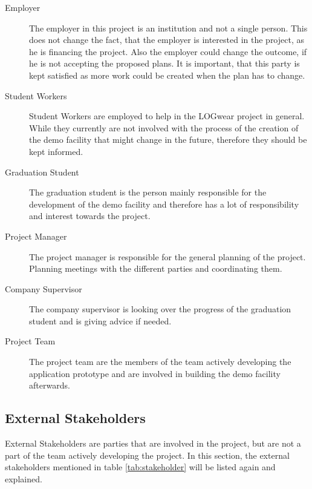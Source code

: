 \begin{description}
	\item[Employer] \hfill
	
	The employer in this project is an institution and not a single person. This does not change the fact, that the employer is interested in the project, as he is financing the project. Also the employer could change the outcome, if he is not accepting the proposed plans. It is important, that this party is kept satisfied as more work could be created when the plan has to change.
	\item[Student Workers] \hfill
	
	Student Workers are employed to help in the LOGwear project in general. While they currently are not involved with the process of the creation of the demo facility that might change in the future, therefore they should be kept informed.
	\item[Graduation Student] \hfill
	
	The graduation student is the person mainly responsible for the development of the demo facility and therefore has a lot of responsibility and interest towards the project.
	\item[Project Manager] \hfill
	
	The project manager is responsible for the general planning of the project. Planning meetings with the different parties and coordinating them.
	\item[Company Supervisor] \hfill
	
	The company supervisor is looking over the progress of the graduation student and is giving advice if needed. 
	\item[Project Team] \hfill
	
	The project team are the members of the team actively developing the application prototype and are involved in building the demo facility afterwards.
\end{description}

\subsection{External Stakeholders}\label{ssec:externalStakeholders}
External Stakeholders are parties that are involved in the project, but are not a part of the team actively developing the project. In this section, the external stakeholders mentioned in table \ref{tab:stakeholder} will be listed again and explained.

